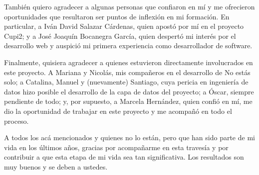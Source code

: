 También quiero agradecer a algunas personas que confiaron en mí y me ofrecieron oportunidades que resultaron ser puntos de inflexión en mi formación. En particular, a Iván David Salazar Cárdenas, quien apostó por mí en el proyecto Cupi2; y a José Joaquín Bocanegra García, quien despertó mi interés por el desarrollo web y auspició mi primera experiencia como desarrollador de software.

Finalmente, quisiera agradecer a quienes estuvieron directamente involucrados en este proyecto. A Mariana y Nicolás, mis compañeros en el desarrollo de No estás solo; a Catalina, Manuel y (nuevamente) Santiago, cuya pericia en ingeniería de datos hizo posible el desarrollo de la capa de datos del proyecto; a Óscar, siempre pendiente de todo; y, por supuesto, a Marcela Hernández, quien confió en mí, me dio la oportunidad de trabajar en este proyecto y me acompañó en todo el proceso.

A todos los acá mencionados y quienes no lo están, pero que han sido parte de mi vida en los últimos años, gracias por acompañarme en esta travesía y por contribuir a que esta etapa de mi vida sea tan significativa. Los resultados son muy buenos y se deben a ustedes. 
